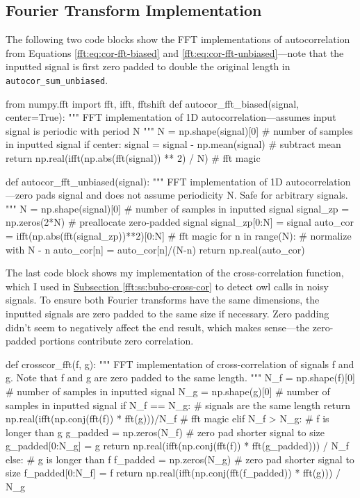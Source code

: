 \documentclass[11pt, a4paper]{article}
\begin{document}
\subsection{Fourier Transform Implementation}
The following two code blocks show the FFT implementations of autocorrelation from Equations \ref{fft:eq:cor-fft-biased} and \ref{fft:eq:cor-fft-unbiased}---note that the inputted signal is first zero padded to double the original length in \texttt{autocor\_sum\_unbiased}.
\begin{python}
from numpy.fft import fft, ifft, fftshift
def autocor_fft_biased(signal, center=True):
    """ FFT implementation of 1D autocorrelation---assumes input signal is periodic with period N """
    N = np.shape(signal)[0]  # number of samples in inputted signal
    if center: signal = signal - np.mean(signal)  # subtract mean
    return np.real(ifft(np.abs(fft(signal)) ** 2) / N)  # fft magic
\end{python}

\begin{python}
def autocor_fft_unbiased(signal):
    """ FFT implementation of 1D autocorrelation---zero pads signal and does not assume periodicity N. Safe for arbitrary signals. """
    N = np.shape(signal)[0]  # number of samples in inputted signal
    signal_zp = np.zeros(2*N)  # preallocate zero-padded signal
    signal_zp[0:N] = signal
    auto_cor = ifft(np.abs(fft(signal_zp))**2)[0:N]  # fft magic
    for n in range(N):  # normalize with N - n
        auto_cor[n] = auto_cor[n]/(N-n)
    return np.real(auto_cor)
\end{python}
The last code block shows my implementation of the cross-correlation function, which I used in  \hyperref[fft:ss:bubo-cross-cor]{Subsection \ref{fft:ss:bubo-cross-cor}} to detect owl calls in noisy signals. To ensure both Fourier transforms have the same dimensions, the inputted signals are zero padded to the same size if necessary. Zero padding didn't seem to negatively affect the end result, which makes sense---the zero-padded portions contribute zero correlation.
\begin{python}
def crosscor_fft(f, g):
    """ FFT implementation of cross-correlation of signals f and g. Note that f and g are zero padded to the same length. """
    N_f = np.shape(f)[0]  # number of samples in inputted signal
    N_g = np.shape(g)[0]  # number of samples in inputted signal
    if N_f == N_g:  # signals are the same length
        return np.real(ifft(np.conj(fft(f)) * fft(g)))/N_f  # fft magic
    elif N_f > N_g:  # f is longer than g
        g_padded = np.zeros(N_f)  # zero pad shorter signal to size
        g_padded[0:N_g] = g
        return np.real(ifft(np.conj(fft(f)) * fft(g_padded))) / N_f
    else:  # g is longer than f
        f_padded = np.zeros(N_g)  # zero pad shorter signal to size
        f_padded[0:N_f] = f
        return np.real(ifft(np.conj(fft(f_padded)) * fft(g))) / N_g
\end{python}
\end{document}
